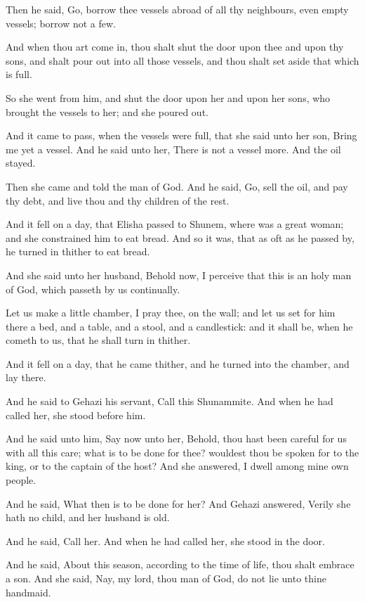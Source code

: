 \verse Then he said, Go, borrow thee vessels abroad of all thy neighbours, even empty vessels; borrow not a few.

\verse And when thou art come in, thou shalt shut the door upon thee and upon thy sons, and shalt pour out into all those vessels, and thou shalt set aside that which is full.

\verse So she went from him, and shut the door upon her and upon her sons, who brought the vessels to her; and she poured out.

\verse And it came to pass, when the vessels were full, that she said unto her son, Bring me yet a vessel. And he said unto her, There is not a vessel more. And the oil stayed.

\verse Then she came and told the man of God. And he said, Go, sell the oil, and pay thy debt, and live thou and thy children of the rest.

\verse And it fell on a day, that Elisha passed to Shunem, where was a great woman; and she constrained him to eat bread. And so it was, that as oft as he passed by, he turned in thither to eat bread.

\verse And she said unto her husband, Behold now, I perceive that this is an holy man of God, which passeth by us continually.

\verse Let us make a little chamber, I pray thee, on the wall; and let us set for him there a bed, and a table, and a stool, and a candlestick: and it shall be, when he cometh to us, that he shall turn in thither.

\verse And it fell on a day, that he came thither, and he turned into the chamber, and lay there.

\verse And he said to Gehazi his servant, Call this Shunammite. And when he had called her, she stood before him.

\verse And he said unto him, Say now unto her, Behold, thou hast been careful for us with all this care; what is to be done for thee?  wouldest thou be spoken for to the king, or to the captain of the host? And she answered, I dwell among mine own people.

\verse And he said, What then is to be done for her? And Gehazi answered, Verily she hath no child, and her husband is old.

\verse And he said, Call her. And when he had called her, she stood in the door.

\verse And he said, About this season, according to the time of life, thou shalt embrace a son. And she said, Nay, my lord, thou man of God, do not lie unto thine handmaid.

